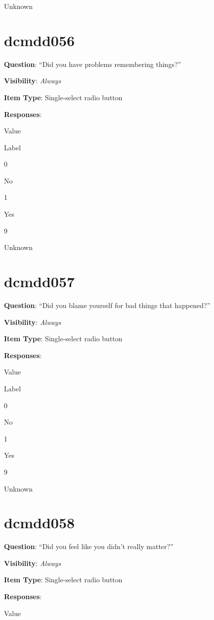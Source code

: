 \documentclass[]{book}
\begin{document}
Unknown

\hypertarget{dcmdd056}{%
\section{dcmdd056}\label{dcmdd056}}

\textbf{Question}: ``Did you have problems remembering things?''

\textbf{Visibility}: \emph{Always}

\textbf{Item Type}: Single-select radio button

\textbf{Responses}:

Value

Label

0

No

1

Yes

9

Unknown

\hypertarget{dcmdd057}{%
\section{dcmdd057}\label{dcmdd057}}

\textbf{Question}: ``Did you blame yourself for bad things that happened?''

\textbf{Visibility}: \emph{Always}

\textbf{Item Type}: Single-select radio button

\textbf{Responses}:

Value

Label

0

No

1

Yes

9

Unknown

\hypertarget{dcmdd058}{%
\section{dcmdd058}\label{dcmdd058}}

\textbf{Question}: ``Did you feel like you didn't really matter?''

\textbf{Visibility}: \emph{Always}

\textbf{Item Type}: Single-select radio button

\textbf{Responses}:

Value
\end{document}
